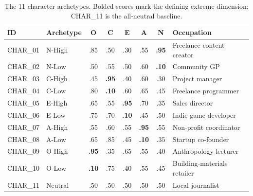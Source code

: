 \begin{table}[h]
\centering
\caption{The 11 character archetypes. Bolded scores mark the defining extreme dimension; CHAR\_11 is the all-neutral baseline.}
\label{tab:characters}
\small
\begin{tabular}{llcccccl}
\toprule
\textbf{ID} & \textbf{Archetype} &
\textbf{O} & \textbf{C} & \textbf{E} & \textbf{A} & \textbf{N} &
\textbf{Occupation} \\
\midrule
CHAR\_01 & N-High  & .85 & .50 & .30 & .55 & \textbf{.95} & Freelance content creator \\
CHAR\_02 & N-Low   & .50 & .55 & .50 & .60 & \textbf{.10} & Community GP \\
CHAR\_03 & C-High  & .45 & \textbf{.95} & .40 & .60 & .30 & Project manager \\
CHAR\_04 & C-Low   & .80 & \textbf{.10} & .60 & .65 & .45 & Freelance programmer \\
CHAR\_05 & E-High  & .65 & .55 & \textbf{.95} & .70 & .35 & Sales director \\
CHAR\_06 & E-Low   & .75 & .70 & \textbf{.10} & .45 & .50 & Indie game developer \\
CHAR\_07 & A-High  & .55 & .60 & .55 & \textbf{.95} & .55 & Non-profit coordinator \\
CHAR\_08 & A-Low   & .65 & .85 & .45 & \textbf{.10} & .35 & Startup co-founder \\
CHAR\_09 & O-High  & \textbf{.95} & .35 & .65 & .55 & .40 & Anthropology lecturer \\
CHAR\_10 & O-Low   & \textbf{.10} & .75 & .40 & .55 & .45 & Building-materials retailer \\
CHAR\_11 & Neutral & .50 & .50 & .50 & .50 & .50 & Local journalist \\
\bottomrule
\end{tabular}
\end{table}
